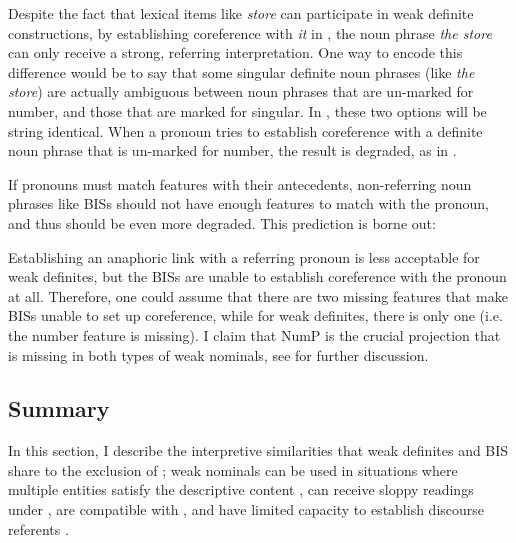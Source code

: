 \documentclass[output=paper,
modfonts
]{langscibook}
\begin{document}
Despite the fact that lexical items like \textit{store} can participate in weak definite constructions, by establishing coreference with \textit{it} in , the noun phrase \textit{the store} can only receive a strong, referring interpretation. One way to encode this difference would be to say that some singular definite noun phrases (like \textit{the store}) are actually ambiguous between noun phrases that are un-marked for number, and those that are marked for singular. In , these two options will be string identical. When a pronoun tries to establish coreference with a definite noun phrase that is un-marked for number, the result is degraded, as in .

If pronouns must match features with their antecedents, non-referring noun phrases like BISs should not have enough features to match with the pronoun, and thus should be even more degraded. This prediction is borne out:

\begin{exe}
\end{exe}

Establishing an anaphoric link with a referring pronoun is less acceptable for weak definites, but the BISs are unable to establish coreference with the pronoun at all. Therefore, one could assume that there are two missing features that make BISs unable to set up coreference, while for weak definites, there is only one (i.e. the number feature is missing). I claim that {Num}P is the crucial projection that is missing in both types of weak nominals, see  for further discussion.


\subsection{Summary}

In this section, I describe the interpretive similarities that weak definites and BIS share to the exclusion of ; weak nominals can be used in situations where multiple entities satisfy the descriptive content , can receive sloppy readings under  , are compatible with  , and have limited capacity to establish discourse referents .
\end{document}
